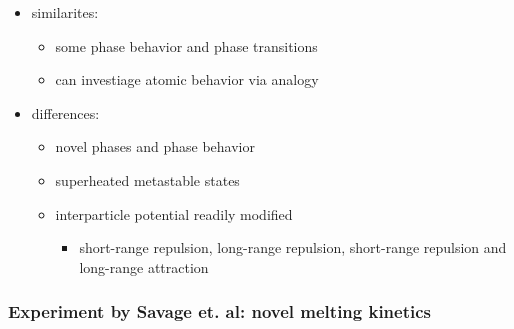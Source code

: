 \documentclass[11pt]{article}
\begin{document}
\begin{itemize}

\item similarites:\\
\label{sec-3.1.1.1}

\begin{itemize}

\item some phase behavior and phase transitions\\
\label{sec-3.1.1.1.1}


\item can investiage atomic behavior via analogy\\
\label{sec-3.1.1.1.2}

\end{itemize} %

\item differences:\\
\label{sec-3.1.1.2}

\begin{itemize}

\item novel phases and phase behavior\\
\label{sec-3.1.1.2.1}


\item superheated metastable states\\
\label{sec-3.1.1.2.2}


\item interparticle potential readily modified\\
\label{sec-3.1.1.2.3}

\begin{itemize}

\item short-range repulsion, long-range repulsion, short-range repulsion and long-range attraction\\
\label{sec-3.1.1.2.3.1}

\end{itemize} %
\end{itemize} %
\end{itemize} %
\subsubsection{Experiment by Savage et. al: novel melting kinetics}
\label{sec-3.1.2}
\end{document}
